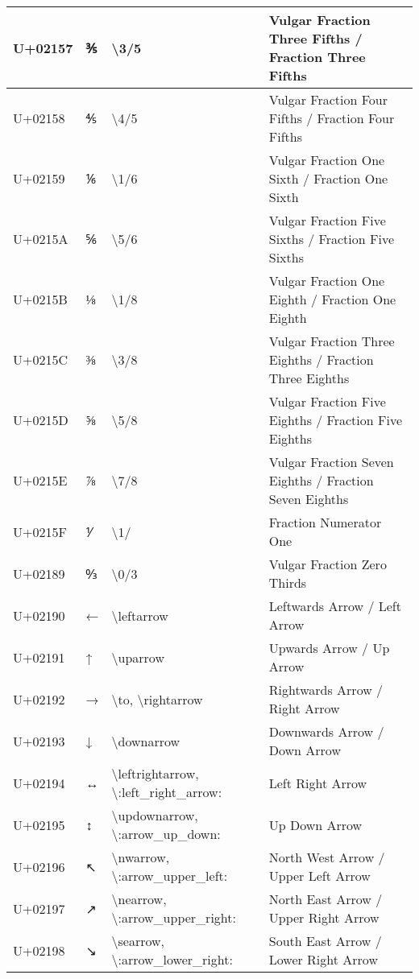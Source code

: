 \begin{table}[h]
\begin{tabulary}{\linewidth}{|L|L|L|L|}
\hline
U+02157 & ⅗ & {\textbackslash}3/5 & Vulgar Fraction Three Fifths / Fraction Three Fifths \\
\hline
U+02158 & ⅘ & {\textbackslash}4/5 & Vulgar Fraction Four Fifths / Fraction Four Fifths \\
\hline
U+02159 & ⅙ & {\textbackslash}1/6 & Vulgar Fraction One Sixth / Fraction One Sixth \\
\hline
U+0215A & ⅚ & {\textbackslash}5/6 & Vulgar Fraction Five Sixths / Fraction Five Sixths \\
\hline
U+0215B & ⅛ & {\textbackslash}1/8 & Vulgar Fraction One Eighth / Fraction One Eighth \\
\hline
U+0215C & ⅜ & {\textbackslash}3/8 & Vulgar Fraction Three Eighths / Fraction Three Eighths \\
\hline
U+0215D & ⅝ & {\textbackslash}5/8 & Vulgar Fraction Five Eighths / Fraction Five Eighths \\
\hline
U+0215E & ⅞ & {\textbackslash}7/8 & Vulgar Fraction Seven Eighths / Fraction Seven Eighths \\
\hline
U+0215F & ⅟ & {\textbackslash}1/ & Fraction Numerator One \\
\hline
U+02189 & ↉ & {\textbackslash}0/3 & Vulgar Fraction Zero Thirds \\
\hline
U+02190 & ← & {\textbackslash}leftarrow & Leftwards Arrow / Left Arrow \\
\hline
U+02191 & ↑ & {\textbackslash}uparrow & Upwards Arrow / Up Arrow \\
\hline
U+02192 & → & {\textbackslash}to, {\textbackslash}rightarrow & Rightwards Arrow / Right Arrow \\
\hline
U+02193 & ↓ & {\textbackslash}downarrow & Downwards Arrow / Down Arrow \\
\hline
U+02194 & ↔ & {\textbackslash}leftrightarrow, {\textbackslash}:left\_right\_arrow: & Left Right Arrow \\
\hline
U+02195 & ↕ & {\textbackslash}updownarrow, {\textbackslash}:arrow\_up\_down: & Up Down Arrow \\
\hline
U+02196 & ↖ & {\textbackslash}nwarrow, {\textbackslash}:arrow\_upper\_left: & North West Arrow / Upper Left Arrow \\
\hline
U+02197 & ↗ & {\textbackslash}nearrow, {\textbackslash}:arrow\_upper\_right: & North East Arrow / Upper Right Arrow \\
\hline
U+02198 & ↘ & {\textbackslash}searrow, {\textbackslash}:arrow\_lower\_right: & South East Arrow / Lower Right Arrow \\

\end{tabulary}
\end{table}
